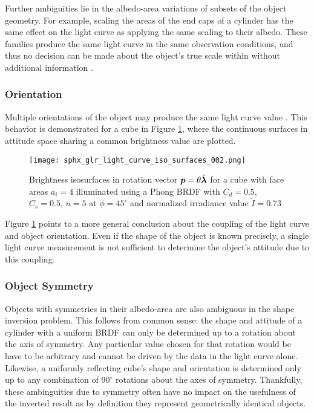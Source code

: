 Further ambiguities lie in the albedo-area variations of subsets of the object geometry. For example, scaling the areas of the end caps of a cylinder has the same effect on the light curve as applying the same scaling to their albedo. These families produce the same light curve in the same observation conditions, and thus no decision can be made about the object's true scale within without additional information \cite{fan2020thesis}.

\subsubsection{Orientation}

Multiple orientations of the object may produce the same light curve value \cite{burton2023attitude}. This behavior is demonstrated for a cube in Figure \ref{fig:brightness_iso}, where the continuous surfaces in attitude space sharing a common brightness value are plotted. 

\begin{figure}[!htb]
  \centering
  \texttt{[image: sphx\_glr\_light\_curve\_iso\_surfaces\_002.png]}
  \caption{Brightness isosurfaces in rotation vector $\bm{p} = \theta \hat{\bm{\lambda}}$ for a cube with face areas $a_i = 4$ illuminated using a Phong BRDF with $C_d=0.5$, $C_s=0.5$, $n=5$ at $\phi=45^\circ$ and normalized irradiance value $\check{I} = 0.73$}
  \label{fig:brightness_iso}
\end{figure}

Figure \ref{fig:brightness_iso} points to a more general conclusion about the coupling of the light curve and object orientation. Even if the shape of the object is known precisely, a single light curve measurement is not sufficient to determine the object's attitude due to this coupling.

\subsubsection{Object Symmetry}

Objects with symmetries in their albedo-area are also ambiguous in the shape inversion problem. This follows from common sense: the shape and attitude of a cylinder with a uniform BRDF can only be determined up to a rotation about the axis of symmetry. Any particular value chosen for that rotation would be have to be arbitrary and cannot be driven by the data in the light curve alone. Likewise, a uniformly reflecting cube's shape and orientation is determined only up to any combination of $90^\circ$ rotations about the axes of symmetry. Thankfully, these ambinguities due to symmetry often have no impact on the usefulness of the inverted result as by definition they represent geometrically identical objects.

